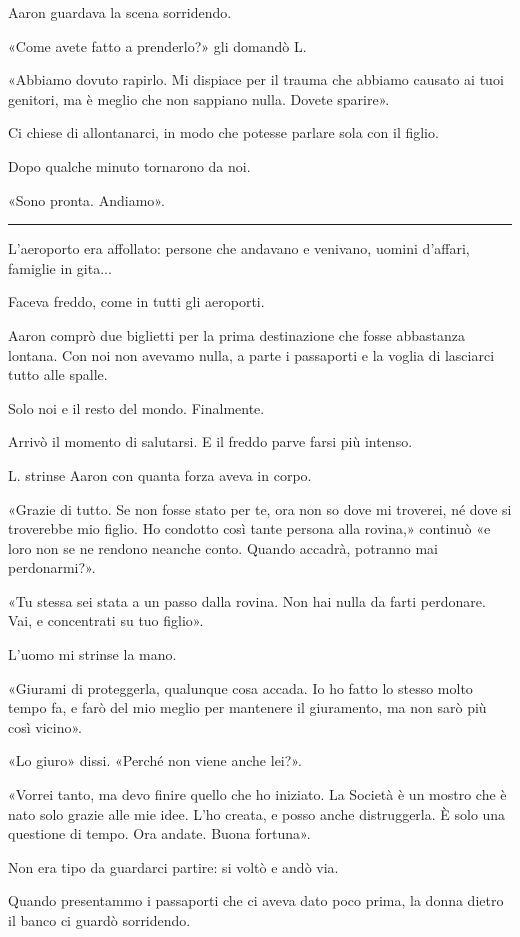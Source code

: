 \documentclass[a4paper,11pt,oneside,openright,final]{memoir}
\begin{document}
Aaron guardava la scena sorridendo.

«Come avete fatto a prenderlo?» gli domandò L.

«Abbiamo dovuto rapirlo. Mi dispiace per il trauma che abbiamo causato ai tuoi
genitori, ma è meglio che non sappiano nulla. Dovete sparire».

Ci chiese di allontanarci, in modo che potesse parlare sola con il figlio.

Dopo qualche minuto tornarono da noi.

«Sono pronta. Andiamo».

\plainbreak{1}

L'aeroporto era affollato: persone che andavano e venivano, uomini d'affari,
famiglie in gita...

Faceva freddo, come in tutti gli aeroporti.

Aaron comprò due biglietti per la prima destinazione che fosse abbastanza
lontana. Con noi non avevamo nulla, a parte i passaporti e la voglia di
lasciarci tutto alle spalle.

Solo noi e il resto del mondo. Finalmente.

Arrivò il momento di salutarsi. E il freddo parve farsi più intenso.

L. strinse Aaron con quanta forza aveva in corpo.

«Grazie di tutto. Se non fosse stato per te, ora non so dove mi troverei, né
dove si troverebbe mio figlio. Ho condotto così tante persona alla rovina,»
continuò «e loro non se ne rendono neanche conto. Quando accadrà, potranno mai
perdonarmi?».

«Tu stessa sei stata a un passo dalla rovina. Non hai nulla da farti perdonare.
Vai, e concentrati su tuo figlio».

L'uomo mi strinse la mano.

«Giurami di proteggerla, qualunque cosa accada. Io ho fatto lo stesso molto
tempo fa, e farò del mio meglio per mantenere il giuramento, ma non sarò più
così vicino».

«Lo giuro» dissi. «Perché non viene anche lei?».

«Vorrei tanto, ma devo finire quello che ho iniziato. La Società è un mostro che
è nato solo grazie alle mie idee. L'ho creata, e posso anche distruggerla. È
solo una questione di tempo. Ora andate. Buona fortuna».

Non era tipo da guardarci partire: si voltò e andò via.

Quando presentammo i passaporti che ci aveva dato poco prima, la donna dietro
il banco ci guardò sorridendo.
\end{document}
